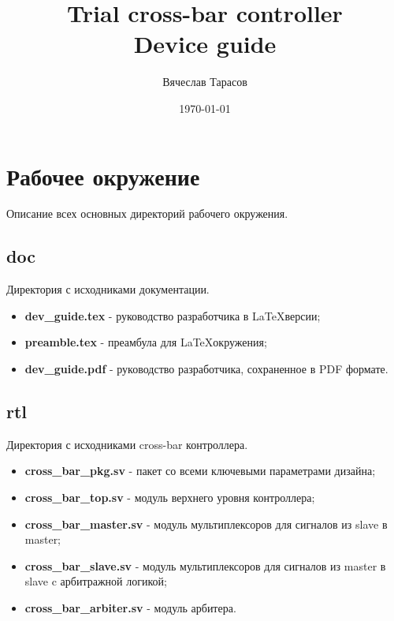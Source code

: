 \documentclass[a4paper, 10pt]{article}
\author{Вячеслав Тарасов}
\title{ Trial cross-bar controller\\
        Device guide}
\date{\today}
\begin{document}
\maketitle
\thispagestyle{empty}
\newpage

\tableofcontents
\pagestyle{myheadings}
\pagestyle{fancy}
\fancyhf{}
\setlength{\headheight}{30pt}
\renewcommand{\headrulewidth}{4pt}
\renewcommand{\footrulewidth}{2pt}
\fancyhead[R]{\leftmark}
\fancyfoot[C]{\thepage}

\newpage
\section{Рабочее окружение}

Описание всех основных директорий рабочего окружения.

\subsection{doc}

Директория с исходниками документации.
\begin{itemize}
 \item \textbf{dev\_guide.tex} - руководство разработчика в \LaTeX версии;
 \item \textbf{preamble.tex} - преамбула для \LaTeX окружения;
 \item \textbf{dev\_guide.pdf} - руководство разработчика, сохраненное в PDF формате.
\end{itemize}

\subsection{rtl}

Директория с исходниками cross-bar контроллера.
\begin{itemize}
 \item \textbf{cross\_bar\_pkg.sv} - пакет со всеми ключевыми параметрами дизайна;
 \item \textbf{cross\_bar\_top.sv} - модуль верхнего уровня контроллера;
 \item \textbf{cross\_bar\_master.sv} - модуль мультиплексоров для сигналов из slave в master;
 \item \textbf{cross\_bar\_slave.sv} - модуль мультиплексоров для сигналов из master в slave c арбитражной логикой;
 \item \textbf{cross\_bar\_arbiter.sv} - модуль арбитера.
\end{itemize}
\end{document}
